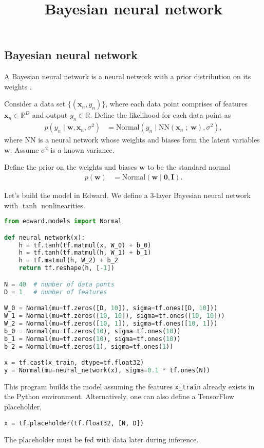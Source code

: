 \title{Bayesian neural network}

\subsection{Bayesian neural network}

A Bayesian neural network is a neural network with a prior
distribution on its weights \citep{neal2012bayesian}.

Consider a data set $\{(\mathbf{x}_n, y_n)\}$, where each data point
comprises of features $\mathbf{x}_n\in\mathbb{R}^D$ and output
$y_n\in\mathbb{R}$. Define the likelihood for each data point as
\begin{align*}
  p(y_n \mid \mathbf{w}, \mathbf{x}_n, \sigma^2)
  &=
  \text{Normal}(y_n \mid \mathrm{NN}(\mathbf{x}_n\;;\;\mathbf{w}), \sigma^2),
\end{align*}
where $\mathrm{NN}$ is a neural network whose weights and biases form
the latent variables $\mathbf{w}$. Assume $\sigma^2$ is a
known variance.

Define the prior on the weights and biases $\mathbf{w}$ to be the standard normal
\begin{align*}
  p(\mathbf{w})
  &=
  \text{Normal}(\mathbf{w} \mid \mathbf{0}, \mathbf{I}).
\end{align*}

Let's build the model in Edward. We define a 3-layer Bayesian neural
network with $\tanh$ nonlinearities.
\begin{lstlisting}[language=Python]
from edward.models import Normal

def neural_network(x):
    h = tf.tanh(tf.matmul(x, W_0) + b_0)
    h = tf.tanh(tf.matmul(h, W_1) + b_1)
    h = tf.matmul(h, W_2) + b_2
    return tf.reshape(h, [-1])

N = 40  # number of data ponts
D = 1   # number of features

W_0 = Normal(mu=tf.zeros([D, 10]), sigma=tf.ones([D, 10]))
W_1 = Normal(mu=tf.zeros([10, 10]), sigma=tf.ones([10, 10]))
W_2 = Normal(mu=tf.zeros([10, 1]), sigma=tf.ones([10, 1]))
b_0 = Normal(mu=tf.zeros(10), sigma=tf.ones(10))
b_1 = Normal(mu=tf.zeros(10), sigma=tf.ones(10))
b_2 = Normal(mu=tf.zeros(1), sigma=tf.ones(1))

x = tf.cast(x_train, dtype=tf.float32)
y = Normal(mu=neural_network(x), sigma=0.1 * tf.ones(N))
\end{lstlisting}
This program builds the model assuming the features \texttt{x\_train}
already exists in the Python environment. Alternatively, one can also
define a TensorFlow placeholder,
\begin{lstlisting}
x = tf.placeholder(tf.float32, [N, D])
\end{lstlisting}
The placeholder must be fed with data later during inference.

